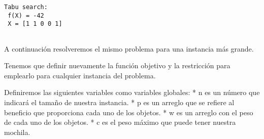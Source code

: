 \documentclass[11pt]{article}
\begin{document}
    \begin{Verbatim}[commandchars=\\\{\}]
Tabu search: 
 f(X) = -42 
 X = [1 1 0 0 1] 
 

    \end{Verbatim}

    A continuación resolveremos el mismo problema para una instancia más
grande.

    Tenemos que definir nuevamente la función objetivo y la restricción para
emplearlo para cualquier instancia del problema.

Definiremos las siguientes variables como variables globales: * n es un
número que indicará el tamaño de nuestra instancia. * p es un arreglo
que se refiere al beneficio que proporciona cada uno de los objetos. * w
es un arreglo con el peso de cada uno de los objetos. * c es el peso
máximo que puede tener nuestra mochila.
\end{document}
